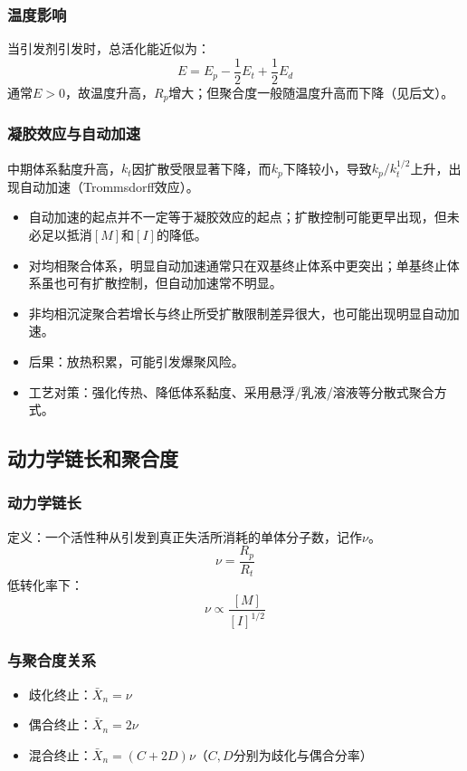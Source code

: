 ﻿\documentclass[12pt,a4paper]{article}
\begin{document}
\subsubsection{温度影响}
当引发剂引发时，总活化能近似为：
\[
E=E_p-\frac{1}{2}E_t+\frac{1}{2}E_d
\]
通常$E>0$，故温度升高，$R_p$增大；但聚合度一般随温度升高而下降（见后文）。

\subsubsection{凝胶效应与自动加速}
中期体系黏度升高，$k_t$因扩散受限显著下降，而$k_p$下降较小，导致$k_p/k_t^{1/2}$上升，出现自动加速（Trommsdorff效应）。
\begin{itemize}
  \item 自动加速的起点并不一定等于凝胶效应的起点；扩散控制可能更早出现，但未必足以抵消$[M]$和$[I]$的降低。
  \item 对均相聚合体系，明显自动加速通常只在双基终止体系中更突出；单基终止体系虽也可有扩散控制，但自动加速常不明显。
  \item 非均相沉淀聚合若增长与终止所受扩散限制差异很大，也可能出现明显自动加速。
  \item 后果：放热积累，可能引发爆聚风险。
  \item 工艺对策：强化传热、降低体系黏度、采用悬浮/乳液/溶液等分散式聚合方式。
\end{itemize}

\subsection{动力学链长和聚合度}
\subsubsection{动力学链长}
定义：一个活性种从引发到真正失活所消耗的单体分子数，记作$\nu$。
\[
\nu=\frac{R_p}{R_t}
\]
低转化率下：
\[
\nu\propto \frac{[M]}{[I]^{1/2}}
\]

\subsubsection{与聚合度关系}
\begin{itemize}
  \item 歧化终止：$\bar{X}_n=\nu$
  \item 偶合终止：$\bar{X}_n=2\nu$
  \item 混合终止：$\bar{X}_n=(C+2D)\nu$（$C,D$分别为歧化与偶合分率）
\end{itemize}
\end{document}
